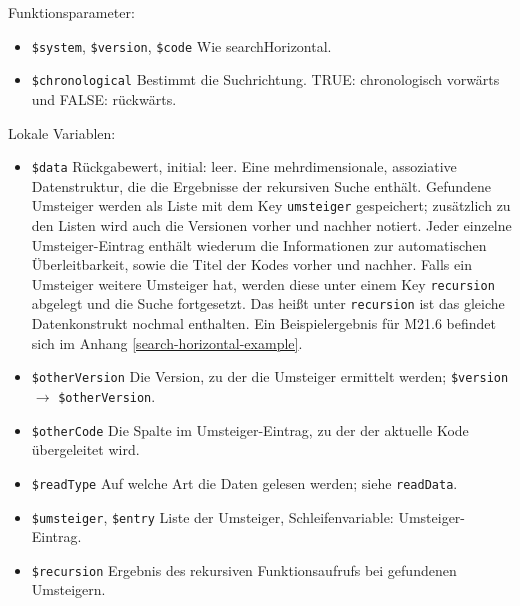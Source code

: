 


Funktionsparameter:

\begin{itemize}
\item \texttt{\$system}, \texttt{\$version}, \texttt{\$code} \newline Wie searchHorizontal. 
\item \texttt{\$chronological}
\newline Bestimmt die Suchrichtung. TRUE: chronologisch vorwärts und FALSE: rückwärts. 
\end{itemize}

Lokale Variablen:

\begin{itemize}
\item \texttt{\$data} \hspace{2em} Rückgabewert, initial: leer.
\newline Eine mehrdimensionale, assoziative Datenstruktur, die die Ergebnisse der rekursiven Suche enthält. Gefundene Umsteiger werden als Liste mit dem Key \texttt{umsteiger} gespeichert; zusätzlich zu den Listen wird auch die Versionen vorher und nachher notiert. Jeder einzelne Umsteiger-Eintrag enthält wiederum die Informationen zur automatischen Überleitbarkeit, sowie die Titel der Kodes vorher und nachher. Falls ein Umsteiger weitere Umsteiger hat, werden diese unter einem Key \texttt{recursion} abgelegt und die Suche fortgesetzt. Das heißt unter \texttt{recursion} ist das gleiche Datenkonstrukt nochmal enthalten. Ein Beispielergebnis für M21.6 befindet sich im Anhang \ref{search-horizontal-example}.
\item \texttt{\$otherVersion} \newline Die Version, zu der die Umsteiger ermittelt werden; \texttt{\$version} $\rightarrow$ \texttt{\$otherVersion}. 
\item \texttt{\$otherCode} \newline Die Spalte im Umsteiger-Eintrag, zu der der aktuelle Kode übergeleitet wird.
\item \texttt{\$readType} \newline Auf welche Art die Daten gelesen werden; siehe \texttt{readData}.
\item \texttt{\$umsteiger}, \texttt{\$entry} \newline Liste der Umsteiger, Schleifenvariable: Umsteiger-Eintrag.
\item \texttt{\$recursion} \newline Ergebnis des rekursiven Funktionsaufrufs bei gefundenen Umsteigern. \\
\end{itemize}

